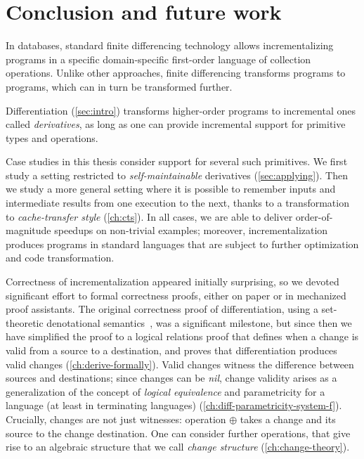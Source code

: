 
\chapter{Conclusion and future work}
\label{ch:incr-conclusion}
In databases, standard finite differencing technology allows incrementalizing
programs in a specific domain-specific first-order language of collection
operations.
Unlike other approaches, finite differencing transforms programs to programs,
which can in turn be transformed further.

Differentiation (\cref{sec:intro}) transforms higher-order programs to incremental ones called \emph{derivatives}, as long as
one can provide incremental support for primitive types and operations.

Case studies in this thesis consider support for several such primitives. We first
study a setting restricted to \emph{self-maintainable} derivatives
(\cref{sec:applying}). Then we study a more general setting where it is possible
to remember inputs and intermediate results from one execution to the next,
thanks to a transformation to \emph{cache-transfer style} (\cref{ch:cts}). In all cases, we are
able to deliver order-of-magnitude speedups on non-trivial examples; moreover,
incrementalization produces programs in standard languages that are subject to
further optimization and code transformation.

Correctness of incrementalization appeared initially surprising, so we devoted
significant effort to formal correctness proofs, either on paper or in
mechanized proof assistants.
The original correctness proof of differentiation, using a set-theoretic
denotational semantics~\citep{CaiEtAl2014ILC}, was a significant milestone, but
since then we have
simplified the proof to a logical relations proof that defines when a change is
valid from a source to a destination, and proves that differentiation produces
valid changes (\cref{ch:derive-formally}). Valid changes witness the difference between
sources and destinations; since changes can be \emph{nil}, change validity
arises as a generalization of the concept of \emph{logical equivalence} and
parametricity for a language (at least in terminating languages)
(\cref{ch:diff-parametricity-system-f}). Crucially,
changes are not just witnesses: operation $\oplus$ takes a change and its
source to the change destination. One can consider further operations, that give
rise to an algebraic structure that we call \emph{change structure} (\cref{ch:change-theory}).

